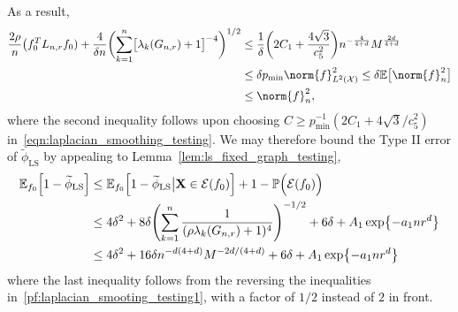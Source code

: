 \documentclass[twoside]{article}
\newcommand{\1}{\mathbf{1}}
\newcommand{\Lap}{L}
\newcommand{\Xset}{\mathcal{X}}
\newcommand{\Leb}{L}
\newcommand{\mc}[1]{\mathcal{#1}}
\newcommand{\Pbb}{\mathbb{P}}
\newcommand{\Ebb}{\mathbb{E}}
\newcommand{\wt}[1]{\widetilde{#1}}
\newcommand{\LS}{\mathrm{LS}}
\theoremstyle{definition}
\theoremstyle{remark}
\begin{document}
As a result, 
\begin{align*}
\frac{2\rho}{n} \bigl(f_0^T \Lap_{n,r} f_0) + \frac{4}{\delta n}\biggl(\sum_{k = 1}^{n} \bigl[\lambda_k(G_{n,r}) + 1\bigr]^{-4}\biggr)^{1/2} & \leq \frac{1}{\delta}\biggl(2C_1 + \frac{4\sqrt{3}}{c_5^2}\biggr)n^{-\frac{4}{4 + d}} M^{\frac{2d}{4 + d}} \\
& \leq \delta p_{\min} \norm{f}_{\Leb^2(\Xset)}^2 \leq \delta \Ebb\bigl[\norm{f}_n^2\bigr] \\
& \leq \norm{f}_n^2,
\end{align*}
where the second inequality follows upon choosing $C \geq p_{\min}^{-1}(2C_1 + 4\sqrt{3}/c_5^2)$ in~\eqref{eqn:laplacian_smoothing_testing}. We may therefore bound the Type II error of $\wt{\phi}_{\LS}$ by appealing to Lemma~\ref{lem:ls_fixed_graph_testing},
\begin{align*}
\Ebb_{f_0}\Bigl[1 - \wt{\phi}_{\LS}\Bigr] & \leq \Ebb_{f_0}\Bigl[1 - \wt{\phi}_{\LS}\big| \mathbf{X} \in \mc{E}(f_0)\Bigr] + 1 - \Pbb\Bigl(\mc{E}(f_0)\Bigr) \\
& \leq 4 \delta^2 + 8 \delta \Biggl(\sum_{k = 1}^{n} \frac{1}{(\rho\lambda_k(G_{n,r}) + 1)^4} \Biggr)^{-1/2} + 6\delta + A_1\exp\bigl\{-a_1nr^{d}\bigr\} \\
& \leq 4 \delta^2 + 16\delta n^{-d(4 + d)}M^{-2d/(4 + d)}  + 6\delta + A_1\exp\bigl\{-a_1nr^{d}\bigr\}
\end{align*}
where the last inequality follows from the reversing the inequalities in~\eqref{pf:laplacian_smooting_testing1}, with a factor of $1/2$ instead of $2$ in front. 
\end{document}
